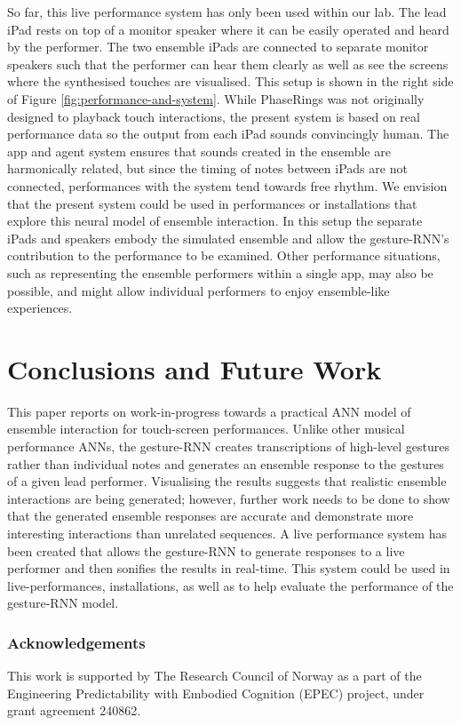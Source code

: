 \documentclass[sigchi]{acmart} %
\begin{document}
So far, this live performance system has only been used within our
lab. The lead iPad rests on top of a monitor speaker where it can be
easily operated and heard by the performer. The two ensemble iPads are
connected to separate monitor speakers such that the performer can
hear them clearly as well as see the screens where the synthesised
touches are visualised. This setup is shown in the right side of
Figure \ref{fig:performance-and-system}. While PhaseRings was not
originally designed to playback touch interactions, the present system
is based on real performance data so the output from each iPad sounds
convincingly human. The app and agent system ensures that sounds
created in the ensemble are harmonically related, but since the timing
of notes between iPads are not connected, performances with the
system tend towards free rhythm. We envision that the present system
could be used in performances or installations that explore this
neural model of ensemble interaction. In this setup the separate
iPads and speakers embody the simulated ensemble and allow the
gesture-RNN's contribution to the performance to be examined. Other
performance situations, such as representing the ensemble performers
within a single app, may also be possible, and might allow individual
performers to enjoy ensemble-like experiences.

\section{Conclusions and Future Work}

This paper reports on work-in-progress towards a practical ANN model
of ensemble interaction for touch-screen performances. Unlike other
musical performance ANNs, the gesture-RNN creates transcriptions of
high-level gestures rather than individual notes and generates an
ensemble response to the gestures of a given lead performer.
Visualising the results suggests that realistic ensemble interactions
are being generated; however, further work needs to be done to show
that the generated ensemble responses are accurate and demonstrate
more interesting interactions than unrelated sequences. A live
performance system has been created that allows the gesture-RNN to
generate responses to a live performer and then sonifies the results
in real-time. This system could be used in live-performances,
installations, as well as to help evaluate the performance of the
gesture-RNN model.

\subsubsection*{Acknowledgements}
This work is supported by The Research Council of Norway as
a part of the Engineering Predictability with Embodied Cognition
(EPEC) project, under grant agreement 240862.

%


\end{document}

